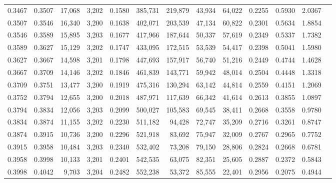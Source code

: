 \begin{tabular}{rrrrrrrrrrrrr}
0.3467 & 0.3507 & 17,068 & 3,202 &                                     0.1580 & 385,731 & 219,879 &  43,934 &  64,022 & 0.2255 & 0.5930 & 2.0367 \\
0.3507 & 0.3546 & 16,340 & 3,200 &                                     0.1638 & 402,071 & 203,539 &  47,134 &  60,822 & 0.2301 & 0.5634 & 1.8854 \\
0.3546 & 0.3589 & 15,895 & 3,203 &                                     0.1677 & 417,966 & 187,644 &  50,337 &  57,619 & 0.2349 & 0.5337 & 1.7382 \\
0.3589 & 0.3627 & 15,129 & 3,202 &                                     0.1747 & 433,095 & 172,515 &  53,539 &  54,417 & 0.2398 & 0.5041 & 1.5980 \\
0.3627 & 0.3667 & 14,598 & 3,201 &                                     0.1798 & 447,693 & 157,917 &  56,740 &  51,216 & 0.2449 & 0.4744 & 1.4628 \\
0.3667 & 0.3709 & 14,146 & 3,202 &                                     0.1846 & 461,839 & 143,771 &  59,942 &  48,014 & 0.2504 & 0.4448 & 1.3318 \\
0.3709 & 0.3751 & 13,477 & 3,200 &                                     0.1919 & 475,316 & 130,294 &  63,142 &  44,814 & 0.2559 & 0.4151 & 1.2069 \\
0.3752 & 0.3794 & 12,655 & 3,200 &                                     0.2018 & 487,971 & 117,639 &  66,342 &  41,614 & 0.2613 & 0.3855 & 1.0897 \\
0.3794 & 0.3834 & 12,056 & 3,203 &                                     0.2099 & 500,027 & 105,583 &  69,545 &  38,411 & 0.2668 & 0.3558 & 0.9780 \\
0.3834 & 0.3874 & 11,155 & 3,202 &                                     0.2230 & 511,182 &  94,428 &  72,747 &  35,209 & 0.2716 & 0.3261 & 0.8747 \\
0.3874 & 0.3915 & 10,736 & 3,200 &                                     0.2296 & 521,918 &  83,692 &  75,947 &  32,009 & 0.2767 & 0.2965 & 0.7752 \\
0.3915 & 0.3958 & 10,484 & 3,203 &                                     0.2340 & 532,402 &  73,208 &  79,150 &  28,806 & 0.2824 & 0.2668 & 0.6781 \\
0.3958 & 0.3998 & 10,133 & 3,201 &                                     0.2401 & 542,535 &  63,075 &  82,351 &  25,605 & 0.2887 & 0.2372 & 0.5843 \\
0.3998 & 0.4042 &  9,703 & 3,204 &                                     0.2482 & 552,238 &  53,372 &  85,555 &  22,401 & 0.2956 & 0.2075 & 0.4944 \\

\end{tabular}
